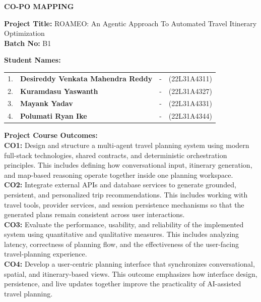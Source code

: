 \documentclass[12pt,a4paper]{report}
\begin{document}
\clearpage
\thispagestyle{mainstyle}

\begin{center}
{\large\bfseries CO-PO MAPPING}
\end{center}
\vspace{0.8cm}

\noindent\textbf{Project Title:} ROAMEO: An Agentic Approach To Automated Travel Itinerary Optimization\\[0.2cm]
\textbf{Batch No:} B1

\vspace{0.7cm}
\noindent\textbf{Student Names:}
\begin{center}
\begin{tabular}{@{}r l c l@{}}
1. & \textbf{Desireddy Venkata Mahendra Reddy} & - & (22L31A4311) \\
[0.25cm]
2. & \textbf{Kuramdasu Yaswanth} & - & (22L31A4327) \\
[0.25cm]
3. & \textbf{Mayank Yadav} & - & (22L31A4331) \\
[0.25cm]
4. & \textbf{Polumati Ryan Ike} & - & (22L31A4344) \\
\end{tabular}
\end{center}

\vspace{1.1cm}
\noindent\textbf{Project Course Outcomes:}\\[0.25cm]
\textbf{CO1:} Design and structure a multi-agent travel planning system using modern full-stack technologies, shared contracts, and deterministic orchestration principles. This includes defining how conversational input, itinerary generation, and map-based reasoning operate together inside one planning workspace.\\[0.45cm]
\textbf{CO2:} Integrate external APIs and database services to generate grounded, persistent, and personalized trip recommendations. This includes working with travel tools, provider services, and session persistence mechanisms so that the generated plans remain consistent across user interactions.\\[0.45cm]
\textbf{CO3:} Evaluate the performance, usability, and reliability of the implemented system using quantitative and qualitative measures. This includes analyzing latency, correctness of planning flow, and the effectiveness of the user-facing travel-planning experience.\\[0.45cm]
\textbf{CO4:} Develop a user-centric planning interface that synchronizes conversational, spatial, and itinerary-based views. This outcome emphasizes how interface design, persistence, and live updates together improve the practicality of AI-assisted travel planning.\\[0.25cm]
\end{document}
